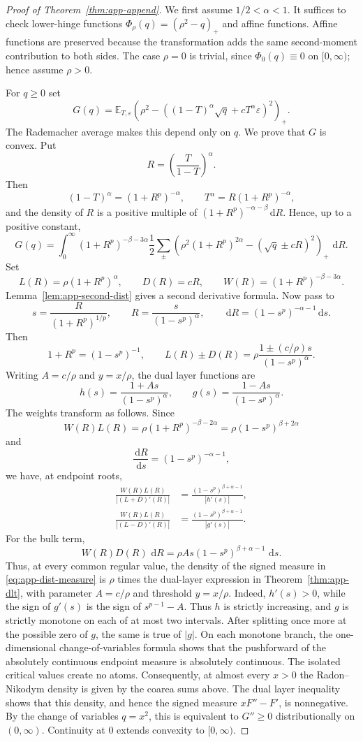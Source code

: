 \documentclass[pdflatex,sn-mathphys-num]{sn-jnl}
\numberwithin{equation}{section}
\theoremstyle{thmstyleone}
\theoremstyle{thmstylethree}
\newcommand{\E}{\mathbb{E}}
\newcommand{\1}{\mathbf{1}}
\newcommand{\dd}{\,\mathrm{d}}
\newcommand{\eps}{\varepsilon}
\begin{document}
\begin{proof}[Proof of Theorem~\ref{thm:app-append}]
We first assume $1/2<\alpha<1$. It suffices to check lower-hinge functions $\Phi_\rho(q)=(\rho^2-q)_+$ and affine functions. Affine functions are preserved because the transformation adds the same second-moment contribution to both sides. The case $\rho=0$ is trivial, since $\Phi_0(q)\equiv0$ on $[0,\infty)$; hence assume $\rho>0$.

For $q\ge0$ set
\[
 G(q)=\E_{T,\eps}\left(\rho^2-\left((1-T)^\alpha\sqrt q+cT^\alpha\eps\right)^2\right)_+.
\]
The Rademacher average makes this depend only on $q$. We prove that $G$ is convex. Put
\[
 R=\left(\frac{T}{1-T}\right)^\alpha.
\]
Then
\[
 (1-T)^\alpha=(1+R^p)^{-\alpha},
 \qquad
 T^\alpha=R(1+R^p)^{-\alpha},
\]
and the density of $R$ is a positive multiple of $(1+R^p)^{-\alpha-\beta}\dd R$. Hence, up to a positive constant,
\[
G(q)=\int_0^\infty (1+R^p)^{-\beta-3\alpha}\frac12\sum_{\pm}
\left(\rho^2(1+R^p)^{2\alpha}-(\sqrt q\pm cR)^2\right)_+\,\dd R.
\]
Set
\[
 L(R)=\rho(1+R^p)^\alpha,
 \qquad
 D(R)=cR,
 \qquad
 W(R)=(1+R^p)^{-\beta-3\alpha}.
\]
Lemma~\ref{lem:app-second-dist} gives a second derivative formula. Now pass to
\[
 s=\frac{R}{(1+R^p)^{1/p}},
 \qquad
 R=\frac{s}{(1-s^p)^\alpha},
 \qquad
 \dd R=(1-s^p)^{-\alpha-1}\dd s.
\]
Then
\[
 1+R^p=(1-s^p)^{-1},
 \qquad
 L(R)\pm D(R)=\rho\frac{1\pm(c/\rho)s}{(1-s^p)^\alpha}.
\]
Writing $A=c/\rho$ and $y=x/\rho$, the dual layer functions are
\[
 h(s)=\frac{1+As}{(1-s^p)^\alpha},
 \qquad
 g(s)=\frac{1-As}{(1-s^p)^\alpha}.
\]
The weights transform as follows. Since
\[
 W(R)L(R)=\rho(1+R^p)^{-\beta-2\alpha}
 =\rho(1-s^p)^{\beta+2\alpha}
\]
and
\[
 \frac{\dd R}{\dd s}=(1-s^p)^{-\alpha-1},
\]
we have, at endpoint roots,
\begin{align*}
 \frac{W(R)L(R)}{|(L+D)'(R)|}
 &=
 \frac{(1-s^p)^{\beta+\alpha-1}}{|h'(s)|},\\
 \frac{W(R)L(R)}{|(L-D)'(R)|}
 &=
 \frac{(1-s^p)^{\beta+\alpha-1}}{|g'(s)|}.
\end{align*}
For the bulk term,
\[
 W(R)D(R)\,\dd R
 =\rho A s(1-s^p)^{\beta+\alpha-1}\,\dd s.
\]
Thus, at every common regular value, the density of the signed
measure in \eqref{eq:app-dist-measure} is $\rho$ times the dual-layer
expression in Theorem~\ref{thm:app-dlt}, with parameter $A=c/\rho$
and threshold $y=x/\rho$. Indeed, $h'(s)>0$, while the sign of $g'(s)$ is the sign of
$s^{p-1}-A$. Thus $h$ is strictly increasing, and $g$ is strictly
monotone on each of at most two intervals. After splitting once more at
the possible zero of $g$, the same is true of $|g|$. On each monotone
branch, the one-dimensional change-of-variables formula shows that the
pushforward of the absolutely continuous endpoint measure is absolutely
continuous. The isolated critical values create no atoms. Consequently,
at almost every $x>0$ the Radon--Nikodym density is given by the coarea
sums above. The dual layer inequality shows that this density, and hence
the signed measure $xF''-F'$, is nonnegative. By the change of variables $q=x^2$, this is
equivalent to $G''\ge0$ distributionally on $(0,\infty)$. Continuity
at $0$ extends convexity to $[0,\infty)$.


\end{proof}
\end{document}
